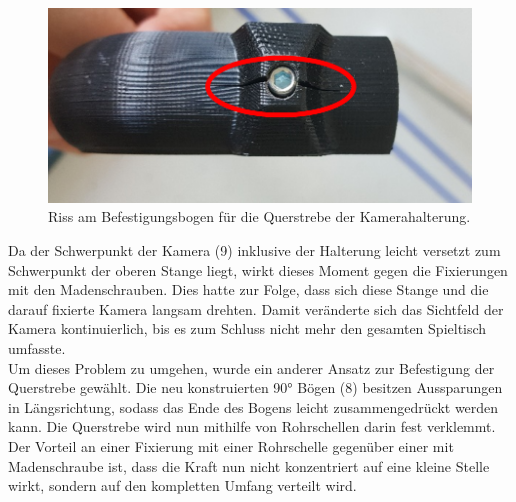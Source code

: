 \begin{figure} [h]

\begin{minipage}[t]{\textwidth}
\vspace{0pt}
\includegraphics[width=\textwidth]{images/HW_Kamera_gebrochen}
\caption{Riss am Befestigungsbogen für die Querstrebe der Kamerahalterung.\\}
\label{HW_Kamera_gebrochen}

\end{minipage}
\end{figure}
 
Da der Schwerpunkt der Kamera (9) inklusive der Halterung leicht versetzt zum Schwerpunkt der oberen Stange liegt, wirkt dieses Moment gegen die Fixierungen mit den Madenschrauben. Dies hatte zur Folge, dass sich diese Stange und die darauf fixierte Kamera langsam drehten. Damit veränderte sich das Sichtfeld der Kamera kontinuierlich, bis es zum Schluss nicht mehr den gesamten Spieltisch umfasste.\\
Um dieses Problem zu umgehen, wurde ein anderer Ansatz zur Befestigung der Querstrebe gewählt. Die neu konstruierten 90° Bögen (8) besitzen Aussparungen in Längsrichtung, sodass das Ende des Bogens leicht zusammengedrückt werden kann. Die Querstrebe wird nun mithilfe von Rohrschellen darin fest verklemmt. Der Vorteil an einer Fixierung mit einer Rohrschelle gegenüber einer mit Madenschraube ist, dass die Kraft nun nicht konzentriert auf eine kleine Stelle wirkt, sondern auf den kompletten Umfang verteilt wird.\\

\clearpage

